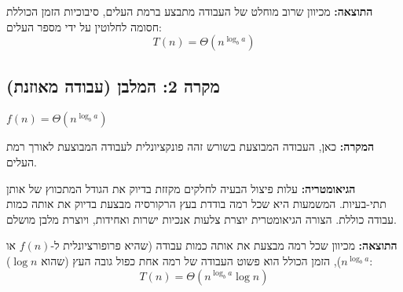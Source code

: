 \documentclass[11pt, a4paper]{article}
\begin{document}
\textbf{התוצאה:} מכיוון שרוב מוחלט של העבודה מתבצע ברמת העלים, סיבוכיות הזמן הכוללת חסומה לחלוטין על ידי מספר העלים:
\begin{equation*}
    T(n) = \Theta(n^{\log_b a})
\end{equation*}

\vspace{0.5cm}
\begin{center}
\end{center}
\vspace{1cm}
\newpage
\subsection*{מקרה 2: המלבן (עבודה מאוזנת)}

\begin{tcolorbox}[colback=accent3!10, colframe=accent3, title=\textbf{התנאי}]
$f(n) = \Theta(n^{\log_b a})$
\end{tcolorbox}
\textbf{המקרה:} כאן, העבודה המבוצעת בשורש זהה פונקציונלית לעבודה המבוצעת לאורך רמת העלים.

\textbf{הגיאומטריה:} עלות פיצול הבעיה לחלקים מקזזת בדיוק את הגודל המתכווץ של אותן תתי-בעיות. המשמעות היא שכל רמה בודדת בעץ הרקורסיה מבצעת בדיוק את אותה כמות עבודה כוללת. הצורה הגיאומטרית יוצרת צלעות אנכיות ישרות ואחידות, ויוצרת מלבן מושלם.

\textbf{התוצאה:} מכיוון שכל רמה מבצעת את אותה כמות עבודה (שהיא פרופורציונלית ל-$f(n)$ או $n^{\log_b a}$), הזמן הכולל הוא פשוט העבודה של רמה אחת כפול גובה העץ (שהוא $\log n$):
\begin{equation*}
    T(n) = \Theta(n^{\log_b a} \log n)
\end{equation*}
\end{document}
